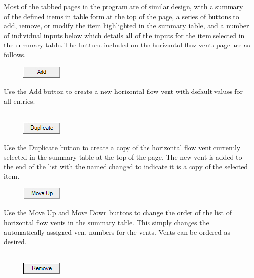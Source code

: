 Most of the tabbed pages in the program are of similar design, with a summary of the defined items in table form at the top of the page, a series of buttons to add, remove, or modify the item highlighted in the summary table, and a number of individual inputs below which details all of the inputs for the item selected in the summary table. The buttons included on the horizontal flow vents page are as follows.

\begin{figure}
  \includegraphics[width=0.781in]{FIGURES/Input_File/Add_Button}
\end{figure}

Use the Add button to create a new horizontal flow vent with default values for all entries. \\~ \\

\begin{figure}
  \includegraphics[width=0.781in]{FIGURES/Input_File/Duplicate_Button}
\end{figure}

Use the Duplicate button to create a copy of the horizontal flow vent currently selected in the summary table at the top of the page. The new vent is added to the end of the list with the named changed to indicate it is a copy of the selected item. \\

\begin{figure}
  \includegraphics[width=0.781in]{FIGURES/Input_File/Move_Up_Button}
\end{figure}

Use the Move Up and Move Down buttons to change the order of the list of horizontal flow vents in the summary table. This simply changes the automatically assigned vent numbers for the vents. Vents can be ordered as desired. \\~ \\

\begin{figure}
  \includegraphics[width=0.781in]{FIGURES/Input_File/Remove_Button}
\end{figure}

